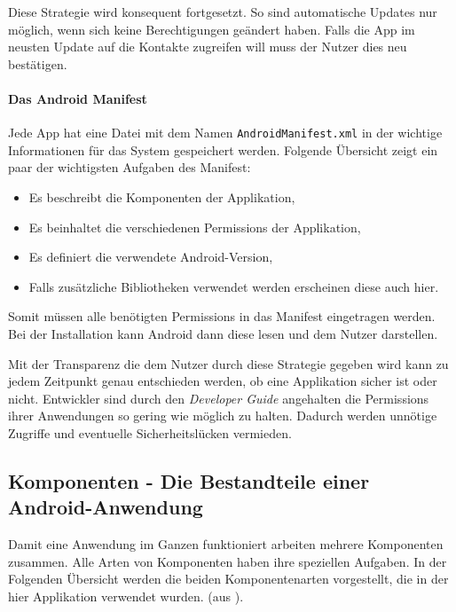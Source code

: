 Diese Strategie wird konsequent fortgesetzt. So sind automatische Updates nur möglich, wenn sich keine Berechtigungen geändert haben. Falls die App im neusten Update auf die Kontakte zugreifen will muss der Nutzer dies neu bestätigen.

\paragraph{Das Android Manifest}

Jede App hat eine Datei mit dem Namen \verb+AndroidManifest.xml+ in der wichtige Informationen für das System gespeichert werden. Folgende Übersicht zeigt ein paar der wichtigsten Aufgaben des Manifest:

\begin{itemize}
	\item Es beschreibt die Komponenten der Applikation,
	\item Es beinhaltet die verschiedenen Permissions der Applikation,
	\item Es definiert die verwendete Android-Version,
	\item Falls zusätzliche Bibliotheken verwendet werden erscheinen diese auch hier.
\end{itemize}

Somit müssen alle benötigten Permissions in das Manifest eingetragen werden. Bei der Installation kann Android dann diese lesen und dem Nutzer darstellen.

Mit der Transparenz die dem Nutzer durch diese Strategie gegeben wird kann zu jedem Zeitpunkt genau entschieden werden, ob eine Applikation sicher ist oder nicht. Entwickler sind durch den \emph{Developer Guide} \cite{android_api} angehalten die Permissions ihrer Anwendungen so gering wie möglich zu halten. Dadurch werden unnötige Zugriffe und eventuelle Sicherheitslücken vermieden.

\subsection{Komponenten - Die Bestandteile einer Android-Anwendung}
\label{components}

Damit eine Anwendung im Ganzen funktioniert arbeiten mehrere Komponenten zusammen. Alle Arten von Komponenten haben ihre speziellen Aufgaben. In der Folgenden Übersicht werden die beiden Komponentenarten vorgestellt, die in der hier Applikation verwendet wurden. (aus \cite{android_components}).

